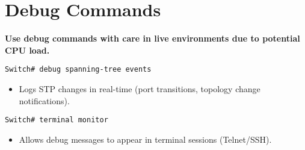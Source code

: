 \documentclass[a4paper]{report}
\begin{document}
\section{Debug Commands}
\textbf{Use debug commands with care in live environments due to potential CPU load.}
\begin{lstlisting}
Switch# debug spanning-tree events
\end{lstlisting}
\begin{itemize}
    \item Logs STP changes in real-time (port transitions, topology change notifications).
\end{itemize}
\begin{lstlisting}
Switch# terminal monitor
\end{lstlisting}
\begin{itemize}
    \item Allows debug messages to appear in terminal sessions (Telnet/SSH).
\end{itemize}
\end{document}
